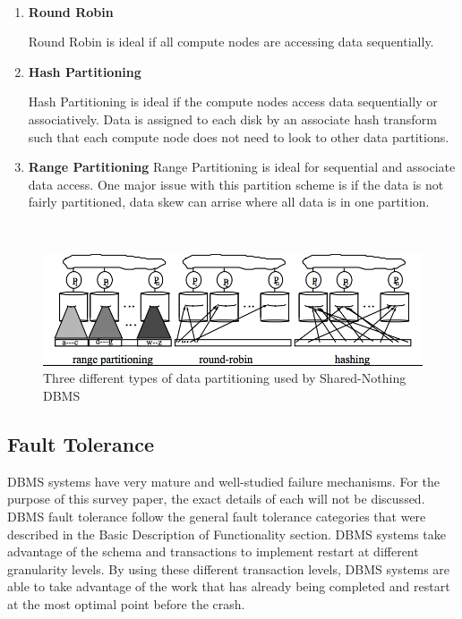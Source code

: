 \documentclass[10pt,twocolumn]{IEEEtran11}
\begin{document}
\  \\
\begin{enumerate}
	\setlength\itemsep{1em}
	\item 
	
	\textbf{Round Robin}
	
	Round Robin is ideal if all compute nodes are accessing data sequentially.
	\item 
		
	\textbf{Hash Partitioning}
	
	Hash Partitioning is ideal if the compute nodes access data sequentially or associatively.  Data is assigned to each disk by an associate hash transform such that each compute node does not need to look to other data partitions.
	
	\item 
	
	\textbf{Range Partitioning}
	Range Partitioning is ideal for sequential and associate data access.  One major issue with this partition scheme is if the data is not fairly partitioned, data skew can arrise where all data is in one partition.
	
\end{enumerate}
\  \\

\begin{figure}[h]
	\centering
	\includegraphics[scale=0.25]{images/dbmsDataPartition.png}
	\caption{Three different types of data partitioning used by Shared-Nothing DBMS  \protect\cite{dewitt1992parallel}}
	\label{fig:dbmsDataPartition}
\end{figure}

\subsection{Fault Tolerance}
DBMS systems have very mature and well-studied failure mechanisms.  For the purpose of this survey paper, the exact details of each will not be discussed.  DBMS fault tolerance follow the general fault tolerance categories that were described in the Basic Description of Functionality section.  DBMS systems take advantage of the schema and transactions to implement restart at different granularity levels.  By using these different transaction levels, DBMS systems are able to 
take advantage of the work that has already being completed and restart at the most optimal point before the crash.
\end{document}
